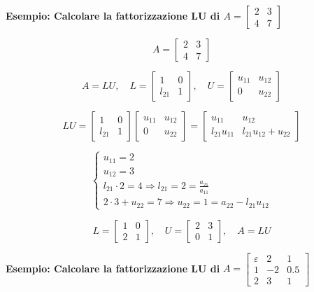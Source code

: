 \documentclass[12pt,a4paper]{article}
\begin{document}
\newpage
\textbf{Esempio: Calcolare la fattorizzazione LU di $A = \begin{bmatrix} 2 & 3 \\ 4 & 7 \end{bmatrix}
$}

\[
A = \begin{bmatrix} 2 & 3 \\ 4 & 7 \end{bmatrix}
\]

\[
A = LU,\quad
L = \begin{bmatrix} 1 & 0 \\ l_{21} & 1 \end{bmatrix},\quad
U = \begin{bmatrix} u_{11} & u_{12} \\ 0 & u_{22} \end{bmatrix}
\]

\[
LU =
\begin{bmatrix}
1 & 0 \\
l_{21} & 1
\end{bmatrix}
\begin{bmatrix}
u_{11} & u_{12} \\
0 & u_{22}
\end{bmatrix}
=
\begin{bmatrix}
u_{11} & u_{12} \\
l_{21} u_{11} & l_{21} u_{12} + u_{22}
\end{bmatrix}
\]

\[
\begin{cases}
u_{11} = 2 \\
u_{12} = 3 \\
l_{21} \cdot 2 = 4 \Rightarrow l_{21} = 2 = \frac{a_{21}}{a_{11}} \\
2 \cdot 3 + u_{22} = 7 \Rightarrow u_{22} = 1 = a_{22}-l_{21}u_{12}
\end{cases}
\]

\[
L = \begin{bmatrix} 1 & 0 \\ 2 & 1 \end{bmatrix},\quad
U = \begin{bmatrix} 2 & 3 \\ 0 & 1 \end{bmatrix},\quad
A = LU
\]

\textbf{Esempio: Calcolare la fattorizzazione LU di }  
$A = \begin{bmatrix} \varepsilon & 2 & 1 \\ 1 & -2 & 0.5 \\ 2 & 3 & 1 \end{bmatrix}$  
\end{document}
